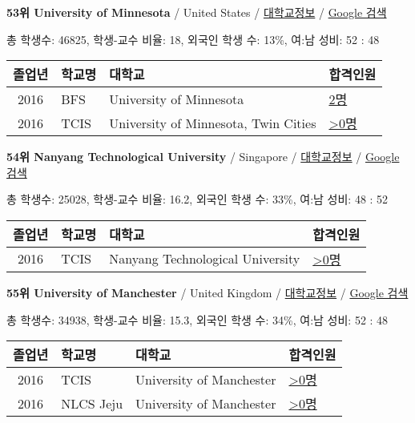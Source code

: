 \documentclass[13pt,]{article}
\begin{document}
\textbf{53위 University of Minnesota} / United States /
\href{https://www.timeshighereducation.com/world-university-rankings/university-of-minnesota?ranking-dataset=589595}{대학교정보}
/ \href{http://www.google.com/search?q=University+of+Minnesota}{Google
검색}

총 학생수: 46825, 학생-교수 비율: 18, 외국인 학생 수: 13\%, 여:남 성비:
52 : 48

\begin{longtable}[]{@{}clll@{}}
\toprule
졸업년 & 학교명 & 대학교 & 합격인원\tabularnewline
\midrule
\endhead
2016 & BFS & University of Minnesota &
\href{http://cafe.naver.com/assarabia/11597}{2명}\tabularnewline
2016 & TCIS & University of Minnesota, Twin Cities &
\href{http://cafe.naver.com/assarabia/11598}{\textgreater{}0명}\tabularnewline
\bottomrule
\end{longtable}

\textbf{54위 Nanyang Technological University} / Singapore /
\href{https://www.timeshighereducation.com/world-university-rankings/nanyang-technological-university?ranking-dataset=589595}{대학교정보}
/
\href{http://www.google.com/search?q=Nanyang+Technological+University}{Google
검색}

총 학생수: 25028, 학생-교수 비율: 16.2, 외국인 학생 수: 33\%, 여:남
성비: 48 : 52

\begin{longtable}[]{@{}clll@{}}
\toprule
졸업년 & 학교명 & 대학교 & 합격인원\tabularnewline
\midrule
\endhead
2016 & TCIS & Nanyang Technological University &
\href{http://cafe.naver.com/assarabia/11598}{\textgreater{}0명}\tabularnewline
\bottomrule
\end{longtable}

\textbf{55위 University of Manchester} / United Kingdom /
\href{https://www.timeshighereducation.com/world-university-rankings/university-of-manchester?ranking-dataset=589595}{대학교정보}
/ \href{http://www.google.com/search?q=University+of+Manchester}{Google
검색}

총 학생수: 34938, 학생-교수 비율: 15.3, 외국인 학생 수: 34\%, 여:남
성비: 52 : 48

\begin{longtable}[]{@{}clll@{}}
\toprule
졸업년 & 학교명 & 대학교 & 합격인원\tabularnewline
\midrule
\endhead
2016 & TCIS & University of Manchester &
\href{http://cafe.naver.com/assarabia/11598}{\textgreater{}0명}\tabularnewline
2016 & NLCS Jeju & University of Manchester &
\href{http://cafe.naver.com/assarabia/11592}{\textgreater{}0명}\tabularnewline
\bottomrule
\end{longtable}
\end{document}
